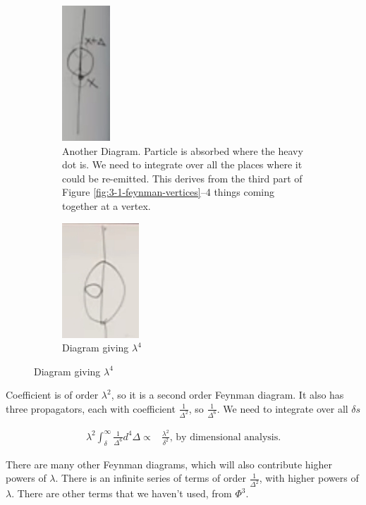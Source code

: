 \documentclass[]{article}
\begin{document}
\begin{figure}[H]
	\begin{center}
		\caption{More diagrams from Figure \ref{fig:mimicking:vertex}}
		\begin{subfigure}[t]{0.45\textwidth}
			\caption{Another Diagram. Particle is absorbed where the heavy dot is. We need to integrate over all the places where it could be re-emitted. This derives from the third part of Figure \ref{fig:3-1-feynman-vertices}--4 things coming together at a vertex.}\label{fig:particles3-another-Feynman}
			\includegraphics{particles3-another-Feynman}
		\end{subfigure}
		\begin{subfigure}[t]{0.45\textwidth}
			\caption{Diagram giving $\lambda^4$}\label{fig:particles3-yet-another-Feynman}
			\includegraphics{particles3-yet-another-Feynman}
		\end{subfigure}
	\end{center}
\end{figure}

Coefficient is of order $\lambda^2$, so it is a second order Feynman diagram. It also has three propagators, each with coefficient $\frac{1}{\Delta^2}$, so $\frac{1}{\Delta^6}$. We need to integrate over all $\delta s$ 

\begin{align*}
	\lambda^2 \int_{\delta}^\infty \frac{1}{\Delta^6} d^4 \Delta \propto& \frac{\lambda^2}{\delta^2} \text{, by dimensional analysis.}
\end{align*}

There are many other Feynman diagrams, which will also contribute higher powers of $\lambda$. There is an infinite series of terms of order $\frac{1}{\Delta^2}$, with higher powers of $\lambda$. There are other terms that we haven't used, from $\Phi^3$.
\end{document}
